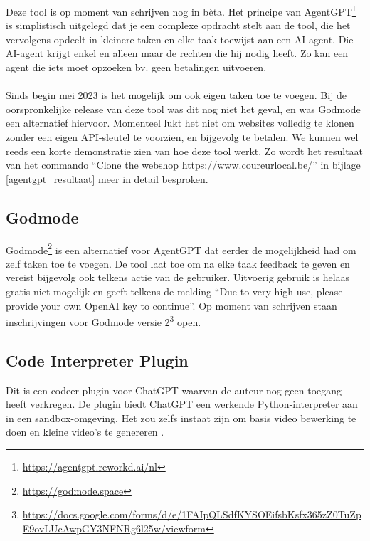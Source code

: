 Deze tool is op moment van schrijven nog in bèta. Het principe van AgentGPT\footnote{\href{https://agentgpt.reworkd.ai/nl}{https://agentgpt.reworkd.ai/nl}} is simplistisch uitgelegd dat je een complexe opdracht stelt aan de tool, die het vervolgens opdeelt in kleinere taken en elke taak toewijst aan een AI-agent. Die AI-agent krijgt enkel en alleen maar de rechten die hij nodig heeft. Zo kan een agent die iets moet opzoeken bv. geen betalingen uitvoeren. 
\\\\
Sinds begin mei 2023 is het mogelijk om ook eigen taken toe te voegen. Bij de oorspronkelijke release van deze tool was dit nog niet het geval, en was Godmode een alternatief hiervoor. Momenteel lukt het niet om websites volledig te klonen zonder een eigen API-sleutel te voorzien, en bijgevolg te betalen. We kunnen wel reeds een korte demonstratie zien van hoe deze tool werkt. Zo wordt het resultaat van het commando “Clone the webshop https://www.coureurlocal.be/” in bijlage \ref{agentgpt_resultaat} meer in detail besproken.
\subsection{Godmode}
Godmode\footnote{\href{https://godmode.space}{https://godmode.space}} is een alternatief voor AgentGPT dat eerder de mogelijkheid had om zelf taken toe te voegen. De tool laat toe om na elke taak feedback te geven en vereist bijgevolg ook telkens actie van de gebruiker. Uitvoerig gebruik is helaas gratis niet mogelijk en geeft telkens de melding “Due to very high use, please provide your own OpenAI key to continue”. Op moment van schrijven staan inschrijvingen voor Godmode versie 2\footnote{ \href{https://docs.google.com/forms/d/e/1FAIpQLSdfKYSOEifsbKsfx365zZ0TuZpE9ovLUcAwpGY3NFNRg6l25w/viewform}{https://docs.google.com/forms/d/e/1FAIpQLSdfKYSOEifsbKsfx365zZ0TuZpE9ovLUcAwpGY3NFNRg6l25w/viewform}} open.
\subsection{Code Interpreter Plugin}
Dit is een codeer plugin voor ChatGPT waarvan de auteur nog geen toegang heeft verkregen. De plugin biedt ChatGPT een werkende Python-interpreter aan in een sandbox-omgeving. Het zou zelfs instaat zijn om basis video bewerking te doen en kleine video's te genereren \autocite{Jose2023}.
